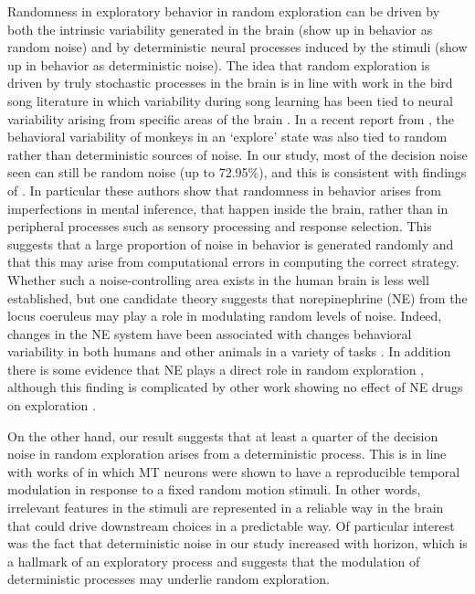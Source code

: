 \documentclass[12pt]{article}
\begin{document}
	Randomness in exploratory behavior in random exploration can be driven by both the intrinsic variability generated in the brain (show up in behavior as random noise) and by deterministic neural processes induced by the stimuli (show up in behavior as deterministic noise).  The idea that random exploration is driven by truly stochastic processes in the brain is in line with work in the bird song literature in which variability during song learning has been tied to neural variability arising from specific areas of the brain \citep{songbird1, songbird2}. In a recent report from \cite{ebitz17}, the behavioral variability of monkeys in an `explore' state was also tied to random rather than deterministic sources of noise. In our study, most of the decision noise seen can still be random noise (up to 72.95\%), and this is consistent with findings of \cite{drugowitsch16}. In particular these authors show that randomness in behavior arises from imperfections in mental inference, that happen inside the brain, rather than in peripheral processes such as sensory processing and response selection. This suggests that a large proportion of noise in behavior is generated randomly and that this may arise from computational errors in computing the correct strategy. %
Whether such a noise-controlling area exists in the human brain is less well established, but one candidate theory \citep{aj2005} suggests that norepinephrine (NE) from the locus coeruleus may play a role in modulating random levels of noise. Indeed, changes in the NE system have been associated with changes behavioral variability in both humans and other animals in a variety of tasks \citep{eeKarpova14, eeKeung18}.  In addition there is some evidence that NE plays a direct role in random exploration \citep{eeWarren17}, although this finding is complicated by other work showing no effect of NE drugs on exploration \citep{jepma2012, nieuwenhuis05}. 

	On the other hand, our result suggests that at least a quarter of the decision noise in random exploration arises from a deterministic process. This is in line with works of \citep{Bair1996} in which MT neurons were shown to have a reproducible temporal modulation in response to a fixed random motion stimuli. In other words, irrelevant features in the stimuli are represented in a reliable way in the brain that could drive downstream choices in a predictable way.  Of particular interest was the fact that deterministic noise in our study increased with horizon, which is a hallmark of an exploratory process and suggests that the modulation of deterministic processes may underlie random exploration.  
	
\end{document}
